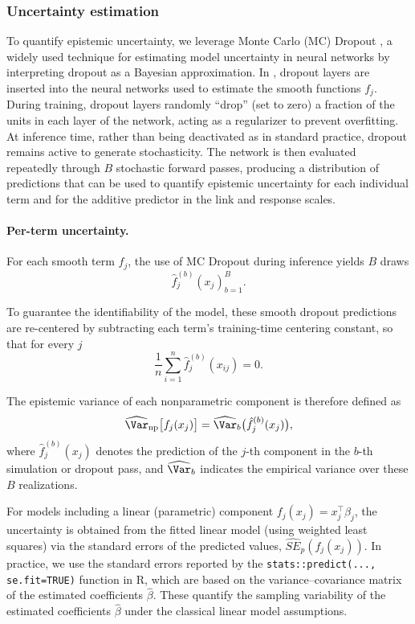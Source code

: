\subsubsection{Uncertainty estimation}
\label{sec:uncertainty}

To quantify epistemic uncertainty, we leverage Monte Carlo (MC) Dropout \citep{gal2016dropout}, a widely used technique for estimating model uncertainty in neural networks by interpreting dropout as a Bayesian approximation. In , dropout layers are inserted into the neural networks used to estimate the smooth functions $f_j$. During training, dropout layers randomly ``drop'' (set to zero) a fraction of the units in each layer of the network, acting as a regularizer to prevent overfitting. At inference time, rather than being deactivated as in standard practice, dropout remains active to generate stochasticity. The network is then evaluated repeatedly through $B$ stochastic forward passes, producing a distribution of predictions that can be used to quantify epistemic uncertainty for each individual term and for the additive predictor in the link and response scales.

\paragraph{Per-term uncertainty.}

For each smooth term $f_j$, the use of MC Dropout during inference yields $B$ draws
\[
\hat f_j^{(b)}(x_j)_{b=1}^B.
\] 

To guarantee the identifiability of the model, these smooth dropout predictions are re-centered by subtracting each term’s training-time centering constant, so that for every $j$
\[\frac{1}{n}\sum_{i=1}^n \hat f_j^{(b)}(x_{ij}) = 0.\]

The epistemic variance of each nonparametric component is therefore defined as 
\[
\widehat{\Var}_{\text{np}}\bigl[f_j(x_j)\bigr] = \widehat{\Var}_b\bigl(\hat f_j^{(b)}(x_j)\bigr),
\]
where $\hat f_j^{(b)}(x_j)$ denotes the prediction of the $j$-th component in the $b$-th simulation or dropout pass, and $\widehat{\Var}_b$ indicates the empirical variance over these $B$ realizations.

For models including a linear (parametric) component $f_j(x_j)= x_j^\top \beta_j $, the uncertainty is obtained from the fitted linear model (using weighted least squares) via the standard errors of the predicted values, $\widehat{SE}_p(f_j(x_j))$. In practice, we use the standard errors reported by the \texttt{stats::predict(..., se.fit=TRUE)} function in \textsf{R}, which are based on the variance--covariance matrix of the estimated coefficients $\hat\beta$. These quantify the sampling variability of the estimated coefficients $\hat\beta$ under the classical linear model assumptions. 

